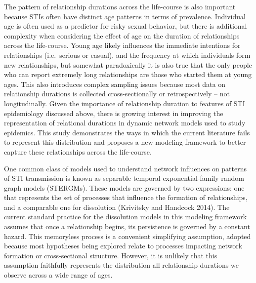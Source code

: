 \documentclass [11pt, proquest] {uwthesis}[2015/03/03]
\begin{document}
The pattern of relationship durations across the life-course is also
important because STIs often have distinct age patterns in terms of
prevalence. Individual age is often used as a predictor for risky sexual
behavior, but there is additional complexity when considering the effect
of age on the duration of relationships across the life-course. Young
age likely influences the immediate intentions for relationships
(i.e.~serious or casual), and the frequency at which individuals form
new relationships, but somewhat paradoxically it is also true that the
only people who can report extremely long relationships are those who
started them at young ages. This also introduces complex sampling issues
because most data on relationship durations is collected
cross-sectionally or retrospectively -- not longitudinally. Given the
importance of relationship duration to features of STI epidemiology
discussed above, there is growing interest in improving the
representation of relational durations in dynamic network models used to
study epidemics. This study demonstrates the ways in which the current
literature fails to represent this distribution and proposes a new
modeling framework to better capture these relationships across the
life-course.

One common class of models used to understand network influences on
patterns of STI transmission is known as separable temporal
exponential-family random graph models (STERGMs). These models are
governed by two expressions: one that represents the set of processes
that influence the formation of relationships, and a comparable one for
dissolution (Krivitsky and Handcock 2014). The current standard practice
for the dissolution models in this modeling framework assumes that once
a relationship begins, its persistence is governed by a constant hazard.
This memoryless process is a convenient simplifying assumption, adopted
because most hypotheses being explored relate to processes impacting
network formation or cross-sectional structure. However, it is unlikely
that this assumption faithfully represents the distribution all
relationship durations we observe across a wide range of ages.
\end{document}
